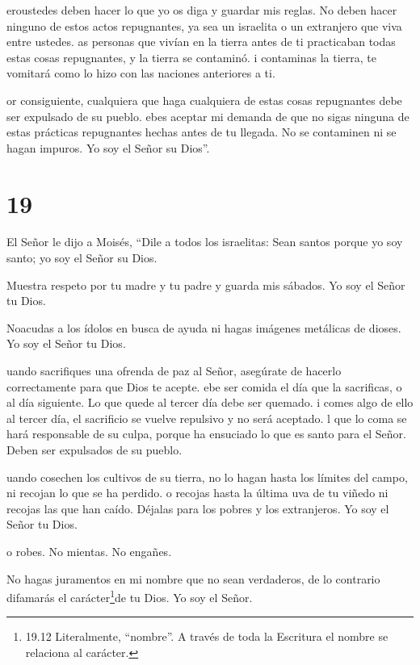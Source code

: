  eroustedes deben hacer lo que yo os diga y guardar mis
reglas. No deben hacer ninguno de estos actos repugnantes, ya sea un
israelita o un extranjero que viva entre ustedes.  as
personas que vivían en la tierra antes de ti practicaban todas estas
cosas repugnantes, y la tierra se contaminó.  i contaminas
la tierra, te vomitará como lo hizo con las naciones anteriores a ti.

 or consiguiente, cualquiera que haga cualquiera de estas
cosas repugnantes debe ser expulsado de su pueblo.  ebes
aceptar mi demanda de que no sigas ninguna de estas prácticas
repugnantes hechas antes de tu llegada. No se contaminen ni se hagan
impuros. Yo soy el Señor su Dios''.

\hypertarget{section-18}{%
\section{19}\label{section-18}}

 El Señor le dijo a Moisés,  ``Dile a todos los
israelitas: Sean santos porque yo soy santo; yo soy el Señor su Dios.

 Muestra respeto por tu madre y tu padre y guarda mis
sábados. Yo soy el Señor tu Dios.

 Noacudas a los ídolos en busca de ayuda ni hagas imágenes
metálicas de dioses. Yo soy el Señor tu Dios.

 uando sacrifiques una ofrenda de paz al Señor, asegúrate de
hacerlo correctamente para que Dios te acepte.  ebe ser
comida el día que la sacrificas, o al día siguiente. Lo que quede al
tercer día debe ser quemado.  i comes algo de ello al tercer
día, el sacrificio se vuelve repulsivo y no será aceptado. 
l que lo coma se hará responsable de su culpa, porque ha ensuciado lo
que es santo para el Señor. Deben ser expulsados de su pueblo.

 uando cosechen los cultivos de su tierra, no lo hagan hasta
los límites del campo, ni recojan lo que se ha perdido.  o
recojas hasta la última uva de tu viñedo ni recojas las que han caído.
Déjalas para los pobres y los extranjeros. Yo soy el Señor tu Dios.

 o robes. No mientas. No engañes.

 No hagas juramentos en mi nombre que no sean verdaderos,
de lo contrario difamarás el carácter\footnote{19.12 Literalmente,
  ``nombre''. A través de toda la Escritura el nombre se relaciona al
  carácter.}de tu Dios. Yo soy el Señor.

